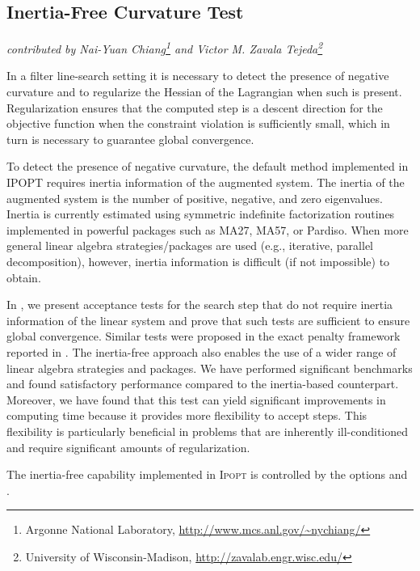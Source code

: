\documentclass[10pt]{article}
\newcommand{\Ipopt}{\textsc{Ipopt}\xspace}
\begin{document}
\subsection{Inertia-Free Curvature Test}
\hfill \textit{contributed by Nai-Yuan Chiang\footnote{Argonne National Laboratory, \url{http://www.mcs.anl.gov/~nychiang/}} and Victor M. Zavala Tejeda\footnote{University of Wisconsin-Madison, \url{http://zavalab.engr.wisc.edu/}}}
\medskip

In a filter line-search setting it is necessary to detect the presence of
negative curvature and to regularize the Hessian of the Lagrangian when
such is present. Regularization ensures that the computed step is a descent
direction for the objective function when the constraint violation is
sufficiently small, which in turn is necessary to guarantee global
convergence.

To detect the presence of negative curvature, the default method
implemented in IPOPT requires inertia information of the augmented system.
The inertia of the augmented system is the number of positive, negative,
and zero eigenvalues. Inertia is currently estimated using symmetric
indefinite factorization routines implemented in powerful packages such as
MA27, MA57, or Pardiso. When more general linear
algebra strategies/packages are used (e.g., iterative, parallel
decomposition), however, inertia information is difficult (if not
impossible) to obtain.

In \cite{ChiangZavala2014}, we present acceptance tests for the search step
that do not require inertia information of the linear system and prove that
such tests are sufficient to ensure global convergence. Similar tests were
proposed in the exact penalty framework reported in \cite{CouHubSchWae:inexact}.
The inertia-free approach also enables the use of a wider range of linear
algebra strategies and packages. We have performed significant benchmarks
and found satisfactory performance compared to the inertia-based
counterpart.  Moreover, we have found that this test can yield significant
improvements in computing time because it provides more flexibility to
accept steps. This flexibility is particularly beneficial in problems that
are inherently ill-conditioned and require significant amounts of
regularization.

The inertia-free capability implemented in \Ipopt is controlled by the
options  and
.
\end{document}
